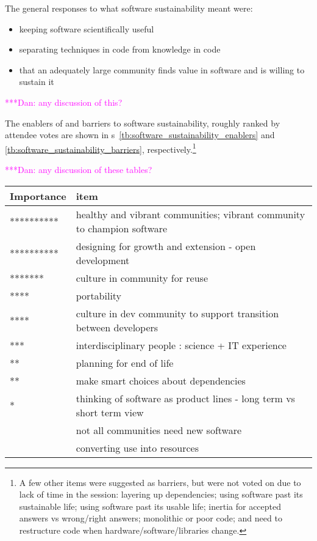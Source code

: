 \documentclass[11pt, oneside]{amsart}
\newcommand{\katznote}[1]{ {\textcolor{magenta}    { ***Dan:      #1 }}}
\begin{document}
The general responses to what software sustainability meant were:
\begin{itemize}
\item keeping software scientifically useful
\item separating techniques in code from knowledge in code
\item that an adequately large community finds value in software and is willing
to sustain it
\end{itemize}

\katznote{any discussion of this?}

The enablers of and barriers to software sustainability, roughly ranked by
attendee votes are shown in
{\tablename}s~\ref{tb:software_sustainability_enablers} and
\ref{tb:software_sustainability_barriers}, respectively.\footnote{A few other
items were suggested as barriers, but were not voted on due to lack of time in
the session:
layering up dependencies;
using software past its sustainable life;
using software past its usable life;
inertia for accepted answers vs wrong/right answers;
monolithic or poor code; and
need to restructure code when hardware/software/libraries change.
}

\katznote{any discussion of these tables?}

\begin{table*}[ht]
\begin{center}
\caption{Enablers of software sustainability, with 0 to 10 `*'s roughly
indicating the fraction of attendees who voted for an item as important}
    \begin{scriptsize}
    \begin{tabular}{ | p{1.65cm} | p{10.0cm} |}
    \hline
  Importance & item \\ \hline \hline
********** & healthy and vibrant communities; vibrant community to champion software \\ \hline
********** & designing for growth and extension - open development \\ \hline
******* & culture in community for reuse \\ \hline
**** & portability \\ \hline
**** & culture in dev community to support transition between developers \\ \hline
*** & interdisciplinary people : science + IT experience \\ \hline
** & planning for end of life \\ \hline
** & make smart choices about dependencies \\ \hline
* & thinking of software as product lines - long term vs short term view \\ \hline
 & not all communities need new software \\ \hline
 & converting use into resources \\ \hline
    \end{tabular}
    \end{scriptsize}
    \label{tb:software_sustainability_enablers}
\end{center}   
\end{table*} 
\end{document}
